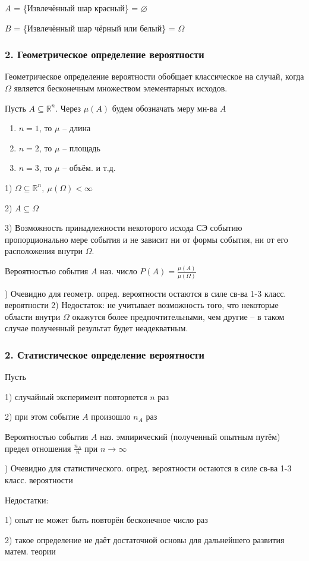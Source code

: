 $A$ = \{Извлечённый шар красный\} = $\varnothing$

$B$ = \{Извлечённый шар чёрный или белый\} = $\Omega$

\subsubsection*{2. Геометрическое определение вероятности}

Геометрическое определение вероятности обобщает классическое на случай, когда $\Omega$ является бесконечным множеством элементарных исходов.

Пусть $A \subseteq \mathbb{R}^n$. Через $\mu(A)$ будем обозначать меру мн-ва $A$
\begin{enumerate}[topsep=0pt, leftmargin=2pt, noitemsep]
	\item [] $n=1$, то $\mu$ -- длина
	
	\item [] $n=2$, то $\mu$ -- площадь
	
	\item [] $n=3$, то $\mu$ -- объём. и т.д.
\end{enumerate}

1) $\Omega \subseteq \mathbb{R}^n, ~\mu(\Omega)<\infty$

2) $A\subseteq\Omega$

3) Возможность принадлежности некоторого исхода СЭ событию пропорционально мере события и не зависит ни от формы события, ни от его расположения внутри $\Omega$.

\OPR Вероятностью события $A$ наз. число $P(A) = \tfrac{\mu(A)}{\mu(\Omega)}$

) Очевидно для геометр. опред. вероятности остаются в силе св-ва 1-3 класс. вероятности
2) Недостаток: не учитывает возможность того, что некоторые области внутри $\Omega$ окажутся более предпочтительными, чем другие -- в таком случае полученный результат будет неадекватным.

\subsubsection*{2. Статистическое определение вероятности}

Пусть

1) случайный эксперимент повторяется $n$ раз

2) при этом событие $A$ произошло $n_A$ раз

\OPR Вероятностью события $A$ наз. эмпирический (полученный опытным путём) предел отношения $\tfrac{n_A}{n}$ при $n\rightarrow\infty$

) Очевидно для статистического. опред. вероятности остаются в силе св-ва 1-3 класс. вероятности

\ZAM Недостатки: 

1) опыт не может быть повторён бесконечное число раз 

2) такое определение не даёт достаточной основы для дальнейшего развития матем. теории

\clearpage
